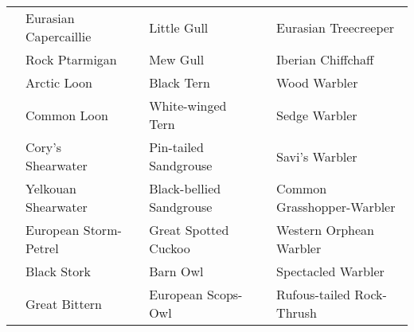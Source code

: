 \documentclass{article}
\begin{document}
\begin{center}
\begin{tabularx}{\textwidth}{cXcXcX}
\underline{\hspace{3ex}} 	 &Eurasian Capercaillie 	 &\underline{\hspace{3ex}} 	 &Little Gull 	 &\underline{\hspace{3ex}} 	 &Eurasian Treecreeper \\ 
\underline{\hspace{3ex}} 	 &Rock Ptarmigan 	 &\underline{\hspace{3ex}} 	 &Mew Gull 	 &\underline{\hspace{3ex}} 	 &Iberian Chiffchaff \\ 
\underline{\hspace{3ex}} 	 &Arctic Loon 	 &\underline{\hspace{3ex}} 	 &Black Tern 	 &\underline{\hspace{3ex}} 	 &Wood Warbler \\ 
\underline{\hspace{3ex}} 	 &Common Loon 	 &\underline{\hspace{3ex}} 	 &White-winged Tern 	 &\underline{\hspace{3ex}} 	 &Sedge Warbler \\ 
\underline{\hspace{3ex}} 	 &Cory's Shearwater 	 &\underline{\hspace{3ex}} 	 &Pin-tailed Sandgrouse 	 &\underline{\hspace{3ex}} 	 &Savi's Warbler \\ 
\underline{\hspace{3ex}} 	 &Yelkouan Shearwater 	 &\underline{\hspace{3ex}} 	 &Black-bellied Sandgrouse 	 &\underline{\hspace{3ex}} 	 &Common Grasshopper-Warbler \\ 
\underline{\hspace{3ex}} 	 &European Storm-Petrel 	 &\underline{\hspace{3ex}} 	 &Great Spotted Cuckoo 	 &\underline{\hspace{3ex}} 	 &Western Orphean Warbler \\ 
\underline{\hspace{3ex}} 	 &Black Stork 	 &\underline{\hspace{3ex}} 	 &Barn Owl 	 &\underline{\hspace{3ex}} 	 &Spectacled Warbler \\ 
\underline{\hspace{3ex}} 	 &Great Bittern 	 &\underline{\hspace{3ex}} 	 &European Scops-Owl 	 &\underline{\hspace{3ex}} 	 &Rufous-tailed Rock-Thrush \\ 

\end{tabularx}
\end{center}
\end{document}
